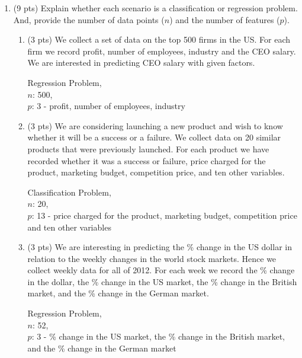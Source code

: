 \documentclass[a4paper]{article}
\theoremstyle{definition}
\newenvironment{soln}{
    \leavevmode\color{blue}\ignorespaces
}{}
\begin{document}
\begin{enumerate}
\item (9 pts) Explain whether each scenario is a classification or regression problem. And, provide the number of data points ($n$) and the number of features ($p$).

\begin{enumerate}
	\item (3 pts) We collect a set of data on the top 500 firms in the US. For each firm we record profit, number of employees, industry and the CEO salary. We are interested in predicting CEO salary with given factors.
	
	\begin{soln}  
            Regression Problem, \\
            $n$: 500, \\
            $p$: 3 - profit, number of employees, industry\end{soln}
	
	\item (3 pts) We are considering launching a new product and wish to know whether it will be a success or a failure. We collect data on 20 similar products that were previously launched. For each product we have recorded whether it was a success or failure, price charged for the product, marketing budget, competition price, and ten other variables.
	
	\begin{soln}
            Classification Problem, \\
            $n$: 20, \\
            $p$: 13 - price charged for the product, marketing budget, competition price and ten other variables
        \end{soln}
	
	\item (3 pts) We are interesting in predicting the \% change in the US dollar in relation to the weekly changes in the world stock markets. Hence we collect weekly data for all of 2012. For each week we record the \% change in the dollar, the \% change in the US market, the \% change in the British market, and the \% change in the German market.
	
	\begin{soln}
            Regression Problem, \\
            $n$: 52, \\
            $p$: 3 - \% change in the US market, the \% change in the British market, and the \% change in the German market\end{soln}
	

\end{enumerate}
\end{enumerate}
\end{document}
